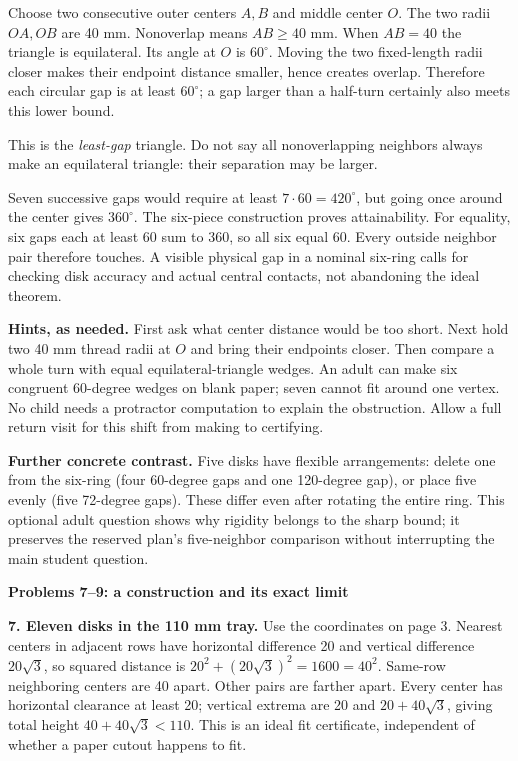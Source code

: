 \documentclass[11pt]{article}
\newcommand{\heading}[1]{\par\textbf{#1}\par}
\begin{document}
Choose two consecutive outer centers $A,B$ and middle center $O$. The two radii $OA,OB$ are 40 mm. Nonoverlap means $AB\ge 40$ mm. When $AB=40$ the triangle is equilateral. Its angle at $O$ is $60^\circ$. Moving the two fixed-length radii closer makes their endpoint distance smaller, hence creates overlap. Therefore each circular gap is at least $60^\circ$; a gap larger than a half-turn certainly also meets this lower bound.

\begin{center}\end{center}
This is the \emph{least-gap} triangle. Do not say all nonoverlapping neighbors always make an equilateral triangle: their separation may be larger.

Seven successive gaps would require at least $7\cdot 60=420^\circ$, but going once around the center gives $360^\circ$. The six-piece construction proves attainability. For equality, six gaps each at least 60 sum to 360, so all six equal 60. Every outside neighbor pair therefore touches. A visible physical gap in a nominal six-ring calls for checking disk accuracy and actual central contacts, not abandoning the ideal theorem.

\textbf{Hints, as needed.} First ask what center distance would be too short. Next hold two 40 mm thread radii at $O$ and bring their endpoints closer. Then compare a whole turn with equal equilateral-triangle wedges. An adult can make six congruent 60-degree wedges on blank paper; seven cannot fit around one vertex. No child needs a protractor computation to explain the obstruction. Allow a full return visit for this shift from making to certifying.

\textbf{Further concrete contrast.} Five disks have flexible arrangements: delete one from the six-ring (four 60-degree gaps and one 120-degree gap), or place five evenly (five 72-degree gaps). These differ even after rotating the entire ring. This optional adult question shows why rigidity belongs to the sharp bound; it preserves the reserved plan's five-neighbor comparison without interrupting the main student question.
\newpage
\heading{Problems 7--9: a construction and its exact limit}
\textbf{7. Eleven disks in the 110 mm tray.} Use the coordinates on page 3. Nearest centers in adjacent rows have horizontal difference 20 and vertical difference $20\sqrt 3$, so squared distance is $20^2+(20\sqrt 3)^2=1600=40^2$. Same-row neighboring centers are 40 apart. Other pairs are farther apart. Every center has horizontal clearance at least 20; vertical extrema are 20 and $20+40\sqrt 3$, giving total height $40+40\sqrt 3<110$. This is an ideal fit certificate, independent of whether a paper cutout happens to fit.
\end{document}
